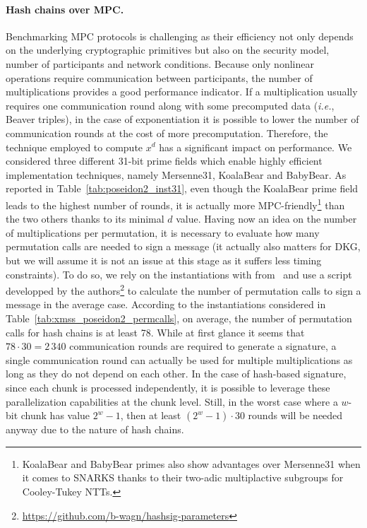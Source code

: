 \paragraph{Hash chains over MPC.}
Benchmarking MPC protocols is challenging as their efficiency not only depends on the underlying cryptographic primitives but also on the security model, number of participants and network conditions.
Because only nonlinear operations require communication between participants, the number of multiplications provides a good performance indicator.
If a multiplication usually requires one communication round along with some precomputed data (\textit{i.e.}, Beaver triples), in the case of exponentiation it is possible to lower the number of communication rounds at the cost of more precomputation.
Therefore, the technique employed to compute $x^d$ has a significant impact on performance.
We considered three different 31-bit prime fields which enable highly efficient implementation techniques, namely Mersenne31, KoalaBear and BabyBear.
As reported in Table~\ref{tab:poseidon2_inst31}, even though the KoalaBear prime field leads to the highest number of rounds, it is actually more MPC-friendly\footnote{KoalaBear and BabyBear primes also show advantages over Mersenne31 when it comes to SNARKS thanks to their two-adic multiplactive subgroups for Cooley-Tukey NTTs.} than the two others thanks to its minimal $d$ value.
Having now an idea on the number of multiplications per permutation, it is necessary to evaluate how many permutation calls are needed to sign a message (it actually also matters for DKG, but we will assume it is not an issue at this stage as it suffers less timing constraints).
To do so, we rely on the \XMSS instantiations with \PoseidonTwo from~\cite{cryptoeprint:2025/055} and use a script developped by the authors\footnote{\url{https://github.com/b-wagn/hashsig-parameters}} to calculate the number of permutation calls to sign a message in the average case.
According to the instantiations considered in Table~\ref{tab:xmss_poseidon2_permcalls}, on average, the number of permutation calls for hash chains is at least 78.
While at first glance it seems that $78 \cdot 30 = 2\,340$ communication rounds are required to generate a signature, a single communication round can actually be used for multiple multiplications as long as they do not depend on each other.
In the case of hash-based signature, since each chunk is processed independently, it is possible to leverage these parallelization capabilities at the chunk level.
Still, in the worst case where a $w$-bit chunk has value $2^w-1$, then at least $(2^w-1) \cdot 30$ rounds will be needed anyway due to the nature of hash chains.
